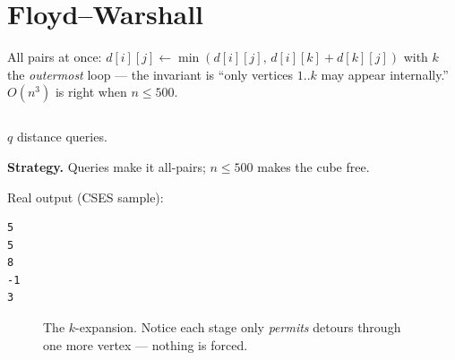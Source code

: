 \section{Floyd--Warshall}\label{sec:fw}
All pairs at once: $d[i][j] \leftarrow \min(d[i][j],\, d[i][k]{+}d[k][j])$
with $k$ the \emph{outermost} loop --- the invariant is ``only
vertices $1..k$ may appear internally.'' $O(n^3)$ is right when
$n \le 500$.
\begin{lstlisting}[language=C++,caption={\texttt{floyd.h}: the
15-line core + \texttt{next} table.},label={lst:fw}]
\end{lstlisting}

\begin{example}\label{ex:routes2}
$q$ distance queries.
\par\smallskip
\textbf{Strategy.} Queries make it all-pairs; $n\le500$ makes the
cube free.
\par\smallskip
\begin{solution}

Real output (CSES sample):
\begin{lstlisting}[numbers=none]
5
5
8
-1
3
\end{lstlisting}
\end{solution}
\end{example}
\begin{figure}[ht]\centering

\caption{The $k$-expansion. Notice each stage only \emph{permits}
detours through one more vertex --- nothing is forced.}
\label{fig:floyd}
\end{figure}


